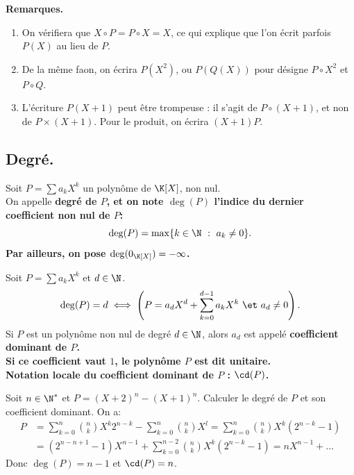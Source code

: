 \documentclass[11pt]{article}
\begin{document}
\vspace*{-0.8cm}

\bf{Remarques.}
\begin{enumerate}
    \item On vérifiera que $X\circ P=P\circ X=X$, ce qui explique que l'on écrit parfois $P(X)$ au lieu de $P$.
    \item De la même faon, on écrira $P(X^2)$, ou $P(Q(X))$ pour désigne $P\circ X^2$ et $P\circ Q$.
    \item L'écriture $P(X+1)$ peut être trompeuse : il s'agit de $P\circ(X+1)$, et non de $P\times(X+1)$. Pour le produit, on écrira $(X+1)P$.
\end{enumerate}

\vspace*{-0.4cm}

\subsection{Degré.}

\begin{defi}{}{}
    Soit $P=\sum a_kX^k$ un polynôme de $\K[X]$, non nul.\\
    On appelle \bf{degré} de $P$, et on note $\deg(P)$ l'indice du dernier coefficient non nul de $P$:
    \begin{equation*}
        \deg(P)=\max\{k\in\N ~:~ a_k\neq0\}.
    \end{equation*}
    Par ailleurs, on pose $\deg(0_{\K[X]})=-\infty$.
\end{defi}

\begin{defi}{}{}
    Soit $P=\sum a_kX^k$ et $d\in\N$.
    \begin{equation*}
        \deg(P)=d \iff \left( P=a_dX^d + \sum_{k=0}^{d-1}a_kX^k ~\et~ a_d \neq 0 \right).
    \end{equation*}
    Si $P$ est un polynôme non nul de degré $d\in\N$, alors $a_d$ est appelé \bf{coefficient dominant} de $P$.\\
    Si ce coefficient vaut $1$, le polynôme $P$ est dit \bf{unitaire.}\\
    Notation locale du coefficient dominant de $P$ : $\cd(P)$.
\end{defi}

\vspace*{-0.8cm}

\begin{ex}{}{}
    Soit $n\in\N^*$ et $P=(X+2)^n-(X+1)^n$. Calculer le degré de $P$ et son coefficient dominant.
    \tcblower
    On a:
    \begin{align*}
        P&=\sum_{k=0}^n\binom{n}{k}X^k2^{n-k} - \sum_{k=0}^n\binom{n}{k}X^l=\sum_{k=0}^n\binom{n}{k}X^k(2^{n-k}-1)\\
        &=(2^{n-n+1}-1)X^{n-1}+\sum_{k=0}^{n-2}\binom{n}{k}X^k(2^{n-k}-1)=nX^{n-1}+...
    \end{align*}
    Donc $\deg(P)=n-1$ et $\cd(P)=n$.
\end{ex}
\end{document}
